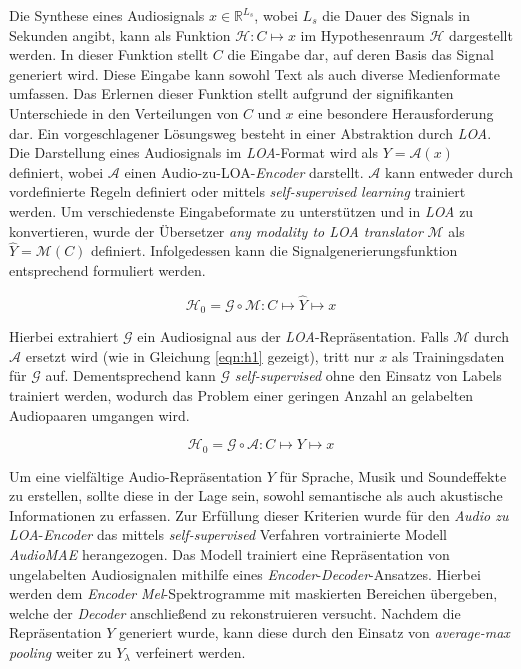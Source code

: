 \documentclass[
  a4paper,  %
  twoside,  %
  bibliography=totoc,
  headsepline,
  cleardoublepage=empty,
  parskip=half,
  draft=false
]{scrbook}
\begin{document}
{Die Synthese eines Audiosignals $x \in \mathbb{R}^{L_s}$, wobei $L_s$ die Dauer des Signals in Sekunden angibt, kann als Funktion $\mathcal{H}: C \mapsto x$ im Hypothesenraum $\mathcal{H}$ dargestellt werden. In dieser Funktion stellt $C$ die Eingabe dar, auf deren Basis das Signal generiert wird. Diese Eingabe kann sowohl Text als auch diverse Medienformate umfassen. Das Erlernen dieser Funktion stellt aufgrund der signifikanten Unterschiede in den Verteilungen von $C$ und $x$ eine besondere Herausforderung dar. Ein vorgeschlagener Lösungsweg besteht in einer Abstraktion durch \emph{LOA}. Die Darstellung eines Audiosignals im \emph{LOA}-Format wird als $Y=\mathcal{A}(x)$ definiert, wobei $\mathcal{A}$ einen Audio-zu-LOA-\emph{Encoder} darstellt. $\mathcal{A}$ kann entweder durch vordefinierte Regeln definiert oder mittels \emph{self-supervised learning} \cite{tan_regeneration_2023} trainiert werden. Um verschiedenste Eingabeformate zu unterstützen und in \emph{LOA} zu konvertieren, wurde der Übersetzer \emph{any modality to LOA translator} $\mathcal{M}$ als $\hat{Y}=\mathcal{M}(C)$ definiert. Infolgedessen kann die Signalgenerierungsfunktion entsprechend formuliert werden. \cite{liu_audioldm2_2023}

\begin{equation}
    \mathcal{H}_0=\mathcal{G} \circ \mathcal{M}: C \mapsto \hat{Y} \mapsto x
\end{equation}

Hierbei extrahiert $\mathcal{G}$ ein Audiosignal aus der \emph{LOA}-Repräsentation. Falls $\mathcal{M}$ durch $\mathcal{A}$ ersetzt wird  (wie in Gleichung \ref{eqn:h1} gezeigt), tritt nur $x$ als Trainingsdaten für $\mathcal{G}$ auf. Dementsprechend kann $\mathcal{G}$ \emph{self-supervised} ohne den Einsatz von Labels trainiert werden, wodurch das Problem einer geringen Anzahl an gelabelten Audiopaaren umgangen wird. \cite{liu_audioldm2_2023}

\begin{equation}
\label{eqn:h1}
    \mathcal{H}_0=\mathcal{G} \circ \mathcal{A}: C \mapsto Y \mapsto x
\end{equation}

Um eine vielfältige Audio-Repräsentation $Y$ für Sprache, Musik und Soundeffekte zu erstellen, sollte diese in der Lage sein, sowohl semantische als auch akustische Informationen zu erfassen. Zur Erfüllung dieser Kriterien wurde für den \emph{Audio zu LOA}-\emph{Encoder} das mittels \emph{self-supervised} Verfahren vortrainierte Modell \emph{AudioMAE} \cite{huang_masked_2023} herangezogen. Das Modell trainiert eine Repräsentation von ungelabelten Audiosignalen mithilfe eines \emph{Encoder}-\emph{Decoder}-Ansatzes. Hierbei werden dem \emph{Encoder} \emph{Mel}-Spektrogramme mit maskierten Bereichen übergeben, welche der \emph{Decoder} anschließend zu rekonstruieren versucht. Nachdem die Repräsentation $Y$ generiert wurde, kann diese durch den Einsatz von \emph{average-max pooling} \cite{liu_simple_2023} weiter zu $Y_\lambda$ verfeinert werden. \cite{liu_audioldm2_2023}

}
\end{document}
